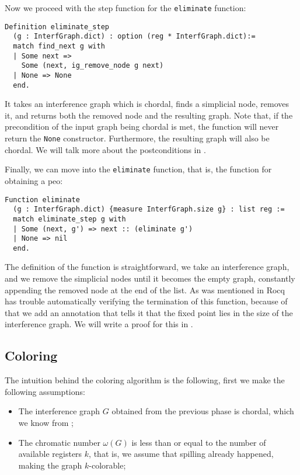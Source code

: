 Now we proceed with the step function for the \texttt{eliminate} function:

\begin{lstlisting}[style=Rocq]
Definition eliminate_step
  (g : InterfGraph.dict) : option (reg * InterfGraph.dict):=
  match find_next g with
  | Some next =>
    Some (next, ig_remove_node g next)
  | None => None
  end.
\end{lstlisting}

It takes an interference graph which is chordal, finds a simplicial node, removes it, and returns both the removed node and the resulting graph.
Note that, if the precondition of the input graph being chordal is met, the function will never return the \texttt{None} constructor. Furthermore, the resulting graph will also be chordal.
We will talk more about the postconditions in .

Finally, we can move into the \texttt{eliminate} function, that is, the function for obtaining a \gls{peo}:

\begin{lstlisting}[style=Rocq]
Function eliminate
  (g : InterfGraph.dict) {measure InterfGraph.size g} : list reg :=
  match eliminate_step g with
  | Some (next, g') => next :: (eliminate g')
  | None => nil
  end.
\end{lstlisting}

The definition of the function is straightforward, we take an interference graph, and we remove the simplicial nodes until it becomes the empty graph, constantly appending the removed node at the end of the list.
As was mentioned in  Rocq has trouble automatically verifying the termination of this function, because of that we add an annotation that tells it that the fixed point lies in the size of the interference graph. We will write a proof for this in .

\subsection{Coloring}
\label{subsec:coloring}

The intuition behind the coloring algorithm is the following, first we make the following assumptions:

\begin{itemize}
  \item The interference graph $G$ obtained from the previous phase is chordal, which we know from ;
  \item The chromatic number $\omega(G)$ is less than or equal to the number of available registers $k$, that is, we assume that spilling already happened, making the graph $k$-colorable;
\end{itemize}

